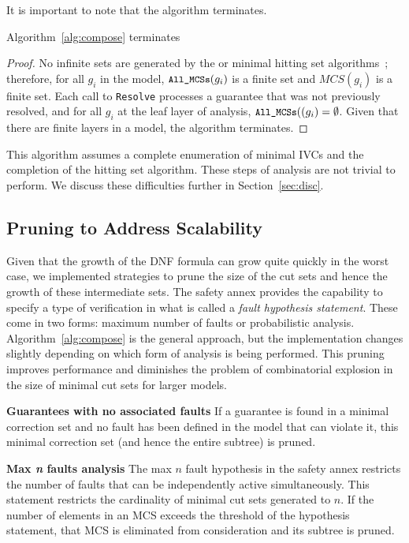 It is important to note that the algorithm terminates. 
\begin{theorem}
Algorithm~\ref{alg:compose} terminates
\begin{proof}
No infinite sets are generated by the \aivcalg or minimal hitting set algorithms~\cite{Ghassabani2017EfficientGO,murakami2013efficient}; therefore, for all $g_i$ in the model, $\texttt{\small{All\_MCSs}}(g_i)$ is a finite set and $\mathit{MCS(g_i)}$ is a finite set.  Each call to \texttt{\small{Resolve}}\xspace processes a guarantee that was not previously resolved, and for all $g_i$ at the leaf layer of analysis, $\texttt{\small{All\_MCSs}}((g_i) = \emptyset$. Given that there are finite layers in a model, the algorithm terminates.  
\end{proof}
\end{theorem}

This algorithm assumes a complete enumeration of minimal IVCs and the completion of the hitting set algorithm. These steps of analysis are not trivial to perform. We discuss these difficulties further in Section~\ref{sec:disc}.

\subsection{Pruning to Address Scalability}
Given that the growth of the DNF formula can grow quite quickly in the worst case, we implemented strategies to prune the size of the cut sets and hence the growth of these intermediate sets. The safety annex provides the capability to specify a type of verification in what is called a \textit{fault hypothesis statement}. These come in two forms: maximum number of faults or probabilistic analysis. Algorithm~\ref{alg:compose} is the general approach, but the implementation changes slightly depending on which form of analysis is being performed. This pruning improves performance and diminishes the problem of combinatorial explosion in the size of minimal cut sets for larger models. 

\textbf{Guarantees with no associated faults} If a guarantee is found in a minimal correction set and no fault has been defined in the model that can violate it, this minimal correction set (and hence the entire subtree) is pruned.

\textbf{Max \textit{n} faults analysis} The max $n$ fault hypothesis in the safety annex restricts the number of faults that can be independently active simultaneously. This statement restricts the cardinality of minimal cut sets generated to $n$. If the number of elements in an MCS exceeds the threshold of the hypothesis statement, that MCS is eliminated from consideration and its subtree is pruned.

